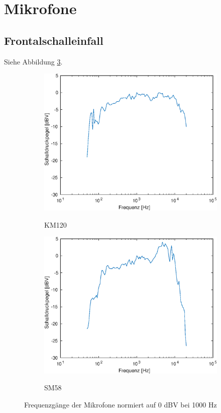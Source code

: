 \section{Mikrofone}
\label{sec:1}

\subsection{Frontalschalleinfall}
Siehe Abbildung \ref{fig:freq0}.

\begin{figure}[H]
    \centering
    \begin{subfigure}{.5\textwidth}
        \centering
        \caption{KM120}
        \includegraphics[width=\linewidth]{Figures/km120_0}
        \label{fig:sub1}
    \end{subfigure}%
    \begin{subfigure}{.5\textwidth}
        \centering
        \caption{SM58}
        \includegraphics[width=\linewidth]{Figures/sm58_0}
        \label{fig:sub2}
    \end{subfigure}
    \caption{Frequenzgänge der Mikrofone normiert auf 0 dBV bei 1000 Hz}
    \label{fig:freq0}
\end{figure}

